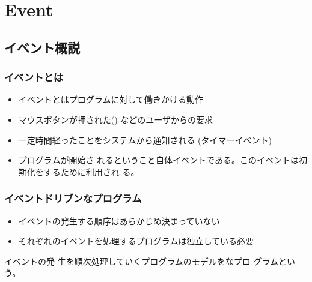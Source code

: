\section{Event}
\subsection{イベント概説}
\begin{frame}[containsverbatim]
\frametitle{イベントとは}
\begin{itemize}
 \item イベントとはプログラムに対して働きかける動作
 \item マウスボタンが押された()
などのユーザからの要求
 \item 一定時間経ったことをシステムから通知される
(タイマーイベント)
 \item プログラムが開始さ
れるということ自体イベントである。このイベントは初期化をするために利用され
る。
\end{itemize}
\end{frame}
\begin{frame}[containsverbatim]
\frametitle{イベントドリブンなプログラム}
\begin{itemize}
 \item イベントの発生する順序はあらかじめ決まっていない
 \item それぞれのイベントを処理するプログラムは独立している必要
\end{itemize}
イベントの発
生を順次処理していくプログラムのモデルをなプロ
グラムという。
\end{frame}
